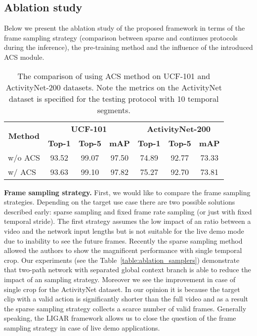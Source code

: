 \documentclass[twoside, twocolumn]{article}
\begin{document}
\subsection{Ablation study} \label{ablation_study}

\lettrine[nindent=0em,lines=3]{B}{}elow we present the ablation study of the proposed framework in terms of the frame
sampling strategy (comparison between sparse and continues protocols during the inference), the pre-training method and
the influence of the introduced ACS module.

\begin{table*}[h]
\caption{The comparison of using ACS method on UCF-101 and ActivityNet-200 datasets. Note the metrics on the ActivityNet
         dataset is specified for the testing protocol with 10 temporal segments.}
\label{table:ablation_acs}
\centering
\begin{tabular}{l|ccc|ccc}
\multicolumn{1}{c|}{\multirow{2}{*}{\textbf{Method}}} & \multicolumn{3}{c|}{\textbf{UCF-101}}               & \multicolumn{3}{c}{\textbf{ActivityNet-200}} \\
\multicolumn{1}{c|}{}                                 & \textbf{Top-1} & \textbf{Top-5} & \textbf{mAP} & \textbf{Top-1} & \textbf{Top-5} & \textbf{mAP} \\ \hline
w/o ACS                                               & 93.52          & 99.07          & 97.50        & 74.89          & 92.77          & 73.33        \\
w/ ACS                                                & 93.63          & 99.10          & 97.82        & 75.27          & 92.70          & 73.81            
\end{tabular}
\end{table*}

\textbf{Frame sampling strategy.} First, we would like to compare the frame sampling strategies. Depending on the target
use case there are two possible solutions described early: sparse sampling and fixed frame rate sampling (or just with
fixed temporal stride). The first strategy assumes the low impact of an ratio between a video and the network input
lengths but is not suitable for the live demo mode due to inability to see the future frames. Recently the sparse
sampling method~\cite{MoViNet} allowed the authors to show the magnificent performance with single temporal crop. Our
experiments (see the Table~\ref{table:ablation_samplers}) demonstrate that two-path network with separated global
context branch is able to reduce the impact of an sampling strategy. Moreover we see the improvement in case of single
crop for the ActivityNet dataset. In our opinion it is because the target clip with a valid action is significantly
shorter than the full video and as a result the sparse sampling strategy collects a scarce number of valid frames.
Generally speaking, the LIGAR framework allows us to close the question of the frame sampling strategy in case of live demo
applications.
\end{document}
